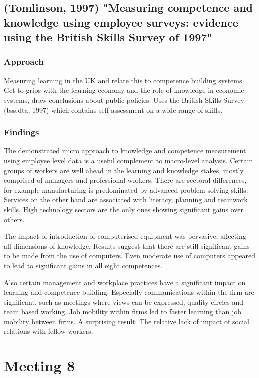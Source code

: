 \documentclass[12pt,a4paper]{article}
\begin{document}
    \subsection{(Tomlinson, 1997) "Measuring competence and knowledge using employee surveys: evidence using the British Skills Survey of 1997"}
      \subsubsection{Approach}
        Measuring learning in the UK and relate this to competence building systems. Get to grips with the learning economy and the role of knowledge in economic systems, draw conclusions about public policies. Uses the British Skills Survey (bss.dta, 1997) which contains self-assessment on a wide range of skills.
        
      \subsubsection{Findings}
        The demonstrated micro approach to knowledge and competence measurement using employee level data is a useful complement to macro-level analysis. Certain groups of workers are well ahead in the learning and knowledge stakes, mostly comprised of managers and professional workers. There are sectoral differences, for example manufacturing is predominated by advanced problem solving skills. Services on the other hand are associated with literacy, planning and teamwork skills. High technology sectors are the only ones showing significant gains over others.
        
        The impact of introduction of computerised equipment was pervasive, affecting all dimensions of knowledge. Results suggest that there are still significant gains to be made from the use of computers. Even moderate use of computers appeared to lead to significant gains in all eight competences.
        
        Also certain management and workplace practices have a significant impact on learning and competence building. Especially communications within the firm are significant, such as meetings where views can be expressed, quality circles and team based working. Job mobility within firms led to faster learning than job mobility between firms. A surprising result: The relative lack of impact of social relations with fellow workers.
  

  \section{Meeting 8} %
  \label{sec:Meeting 8}
\end{document}
